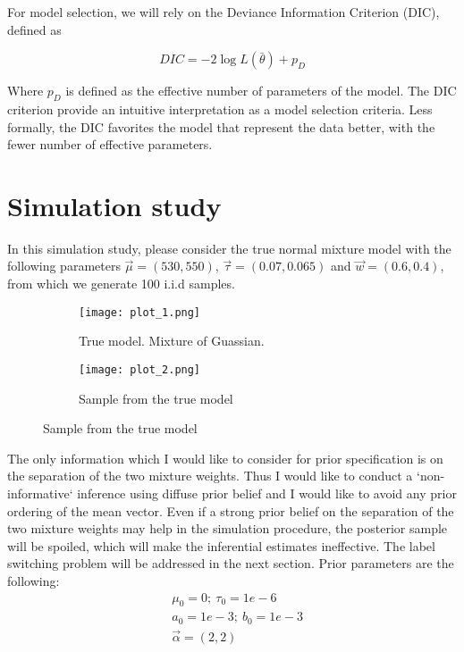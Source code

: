 \documentclass{article}
\begin{document}
For model selection, we will rely on the Deviance Information Criterion (DIC), defined as

\begin{equation}
DIC = - 2 \log L(\bar{\theta}) + p_D
\end{equation}

Where $p_D$ is defined as the effective number of parameters of the model. The DIC criterion provide an intuitive interpretation as a model selection criteria. Less formally, the DIC favorites the model that represent the data better, with the fewer number of effective parameters.

\section{Simulation study}
In this simulation study, please consider the true normal mixture model with the following parameters $\vec \mu  = (530,550)$, $\vec \tau = (0.07, 0.065)$ and $\vec w = (0.6, 0.4)$, from which we generate 100 i.i.d samples.

\begin{figure}[h!]
    \begin{subfigure}{0.5\textwidth}
        \texttt{[image: plot\_1.png]}
        \caption{True model. Mixture of Guassian.}
        \label{Mixture of gaussians}
    \end{subfigure}
    \begin{subfigure}{0.5\textwidth}
        \texttt{[image: plot\_2.png]}
        \caption{Sample from the true model}
        \label{Mixture of gaussians}
    \end{subfigure}
\end{figure}


The only information which I would like to consider for prior specification is on the separation of the two mixture weights. Thus I would like to conduct a `non-informative` inference using diffuse prior belief and I would like to avoid any prior ordering of the mean vector. Even if a strong prior belief on the separation of the two mixture weights may help in the simulation procedure, the posterior sample will be spoiled, which will make the inferential estimates ineffective. The label switching problem will be addressed in the next section. 
Prior parameters are the following:
\begin{align*}
& \mu_0 = 0; \ \tau_0 = 1e-6 \\
& a_0 = 1e-3;\  b_0 = 1e-3 \\
& \vec \alpha = (2,2)
\end{align*}
\end{document}
